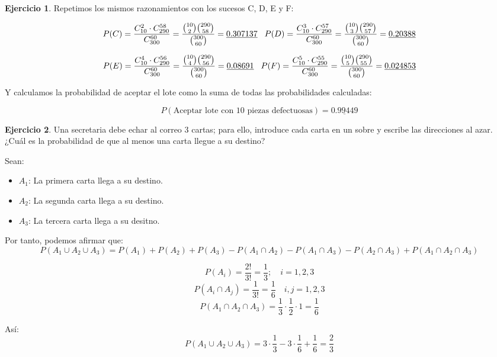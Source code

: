 \documentclass[a4paper, 12pt]{article}
\theoremstyle{definition}
\newtheorem{ej}{Ejercicio}
\begin{document}
\begin{ej}
Repetimos los mismos razonamientos con los sucesos C, D, E y F:

\[
    P(C) = \frac{C_{10}^{2} \cdot C_{290}^{58}}{C_{300}^{60}} = \frac{\binom{10}{2} \binom{290}{58}}{\binom{300}{60}} = \underline{0.307137} \hspace{0.3cm}
    P(D) = \frac{C_{10}^{3} \cdot C_{290}^{57}}{C_{300}^{60}} = \frac{\binom{10}{3} \binom{290}{57}}{\binom{300}{60}} = \underline{0.20388}
\]

\[
    P(E) = \frac{C_{10}^{4} \cdot C_{290}^{56}}{C_{300}^{60}} = \frac{\binom{10}{4} \binom{290}{56}}{\binom{300}{60}} = \underline{0.08691} \hspace{0.3cm}
    P(F) = \frac{C_{10}^{5} \cdot C_{290}^{55}}{C_{300}^{60}} = \frac{\binom{10}{5} \binom{290}{55}}{\binom{300}{60}} = \underline{0.024853}
\]

Y calculamos la probabilidad de aceptar el lote como la suma de todas las probabilidades calculadas:

\[
    P(\text{Aceptar lote con 10 piezas defectuosas}) = \underline{0.99449}
\]


\end{ej}

\begin{ej}
Una secretaria debe echar al correo 3 cartas; para ello, introduce cada carta en un sobre y escribe las direcciones al azar. ¿Cuál es la probabilidad de que al menos una carta llegue a su destino?

Sean:
\begin{itemize}
	\item \(A_1\): La primera carta llega a su destino.
	\item \(A_2\): La segunda carta llega a su destino.
	\item \(A_3\): La tercera carta llega a su desitno.
\end{itemize}

Por tanto, podemos afirmar que:
\[
	P(A_1 \cup A_2 \cup A_3) = P(A_1) + P(A_2) + P(A_3) - P(A_1 \cap A_2) - P(A_1 \cap A_3) - P(A_2 \cap A_3) + P(A_1 \cap A_2 \cap A_3)
\]

\[
	P(A_i) = \frac{2!}{3!} = \frac{1}{3}; \quad i = 1,2,3
\]
\[
	P(A_i \cap A_j) = \frac{1}{3!} = \frac{1}{6} \quad i,j = 1,2,3
\]
\[
	P(A_1 \cap A_2 \cap A_3) = \frac{1}{3} \cdot \frac{1}{2} \cdot 1 = \frac{1}{6}
\]

Así:
\[
	P(A_1 \cup A_2 \cup A_3) = 3 \cdot \frac{1}{3} - 3 \cdot \frac{1}{6} + \frac{1}{6} = \frac{2}{3}
\]
\end{ej}
\end{document}
